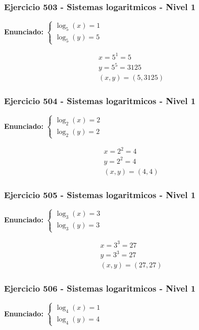 \documentclass[12pt,a4paper]{article}
\begin{document}
\subsubsection*{Ejercicio 503 - Sistemas logaritmicos - Nivel 1}
\textbf{Enunciado:} \(\begin{cases} \log_{5}\left(x\right)=1\\ \log_{5}\left(y\right)=5\end{cases}\)

\[
\begin{aligned}
x=5^{1}=5\\
y=5^{5}=3125\\
\boxed{(x,y)=(5,3125)}
\end{aligned}
\]


\subsubsection*{Ejercicio 504 - Sistemas logaritmicos - Nivel 1}
\textbf{Enunciado:} \(\begin{cases} \log_{2}\left(x\right)=2\\ \log_{2}\left(y\right)=2\end{cases}\)

\[
\begin{aligned}
x=2^{2}=4\\
y=2^{2}=4\\
\boxed{(x,y)=(4,4)}
\end{aligned}
\]


\subsubsection*{Ejercicio 505 - Sistemas logaritmicos - Nivel 1}
\textbf{Enunciado:} \(\begin{cases} \log_{3}\left(x\right)=3\\ \log_{3}\left(y\right)=3\end{cases}\)

\[
\begin{aligned}
x=3^{3}=27\\
y=3^{3}=27\\
\boxed{(x,y)=(27,27)}
\end{aligned}
\]


\subsubsection*{Ejercicio 506 - Sistemas logaritmicos - Nivel 1}
\textbf{Enunciado:} \(\begin{cases} \log_{4}\left(x\right)=1\\ \log_{4}\left(y\right)=4\end{cases}\)
\end{document}
